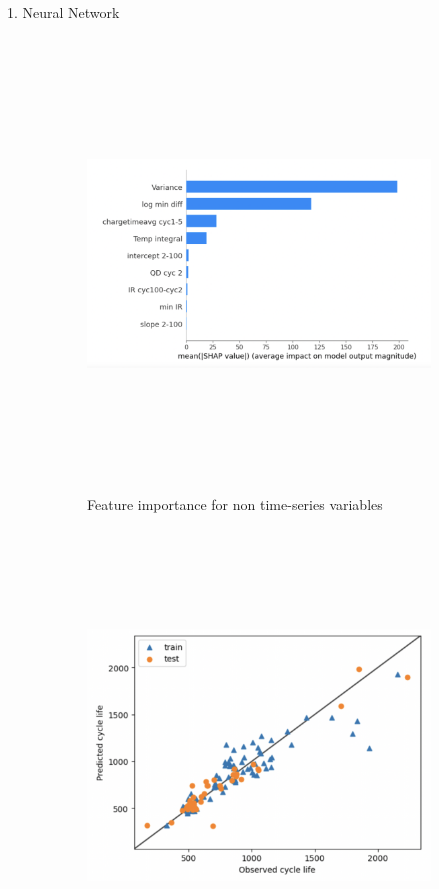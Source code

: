 \documentclass[final]{beamer}
\newlength{\colwidth}
\begin{document}
\begin{frame}[t]
\begin{columns}[t]
\begin{column}{\colwidth}
\begin{block}{1. Neural Network}
    \begin{figure}[H]
     \centering
     \begin{subfigure}[b]{0.5\textwidth}
         \centering
         \includegraphics[width=\colwidth/2,height = 12cm]{figs/shap.png}
         \caption{Feature importance for non time-series variables}
     \end{subfigure}
     \hfill
     \begin{subfigure}[b]{0.49\textwidth}
        \centering
        \includegraphics[width=\colwidth/2,height = 12cm]{figs/obspred.png}

\end{subfigure}
\end{figure}
\end{block}
\end{column}
\end{columns}
\end{frame}
\end{document}
